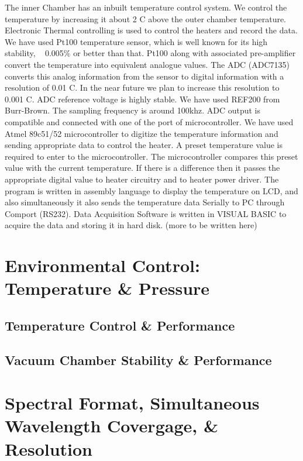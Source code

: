 \documentclass[12pt,preprint]{emulateapj}
\begin{document}
The inner Chamber has an inbuilt temperature control system. We control the temperature by increasing it about 2 C above the outer chamber temperature. Electronic Thermal controlling is used to control the heaters and record the data. We have used Pt100 temperature sensor, which is well known for its high stability, ~ 0.005\% or better than that. Pt100 along with associated pre-amplifier convert the temperature into equivalent analogue values. The ADC (ADC7135) converts this analog information from the sensor to digital information with a resolution of 0.01 C. In the near future we plan to increase this resolution to 0.001 C. ADC reference voltage is highly stable. We have used REF200 from Burr-Brown. The sampling frequency is around 100khz. ADC output is compatible and connected with one of the port of microcontroller. We have used Atmel 89c51/52 microcontroller to digitize the temperature information and sending appropriate data to control the heater. A preset temperature value is required to enter to the microcontroller. The microcontroller compares this preset value with the current temperature. If there is a difference then it passes the appropriate digital value to heater circuitry and to heater power driver. The program is written in assembly language to display the temperature on LCD, and also simultaneously it also sends the temperature data Serially to PC through Comport (RS232). Data Acquisition Software is written in VISUAL BASIC to acquire the data and storing it in hard disk. (more to be written here)
\section{Environmental Control: Temperature \& Pressure}
\subsection{Temperature Control \& Performance}
\subsection{Vacuum Chamber Stability \& Performance}
\section{Spectral Format, Simultaneous Wavelength Covergage, \& Resolution}
\end{document}
